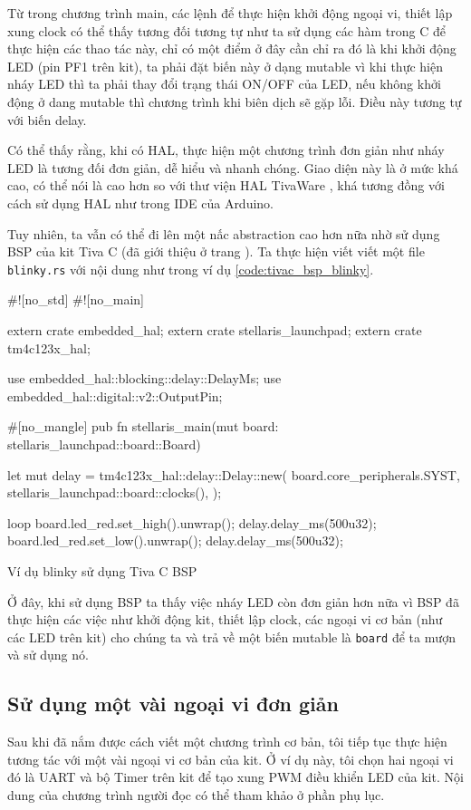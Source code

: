 Từ trong chương trình main, các lệnh để thực hiện khởi động ngoại vi, thiết lập xung clock có thể thấy tương đối tương tự như ta sử dụng các hàm trong C để thực hiện các thao tác này, chỉ có một điểm ở đây cần chỉ ra đó là khi khởi động LED (pin PF1 trên kit), ta phải đặt biến này ở dạng mutable vì khi thực hiện nháy LED thì ta phải thay đổi trạng thái ON/OFF của LED, nếu không khởi động ở dang mutable thì chương trình khi biên dịch sẽ gặp lỗi. Điều này tương tự với biến delay.

Có thể thấy rằng, khi có HAL, thực hiện một chương trình đơn giản như nháy LED là tương đối đơn giản, dễ hiểu và nhanh chóng.
Giao diện này là ở mức khá cao, có thể nói là cao hơn so với thư viện HAL TivaWare \cite{tivac_tivaware}, khá tương đồng với cách sử dụng HAL như trong IDE của Arduino.

Tuy nhiên, ta vẫn có thể đi lên một nấc abstraction cao hơn nữa nhờ sử dụng BSP của kit Tiva C (đã giới thiệu ở trang \pageref{lbl:tivac_bsp}).
Ta thực hiện viết viết một file \texttt{blinky.rs} với nội dung như trong ví dụ \ref{code:tivac_bsp_blinky}.

\begin{listing}[ht]
\begin{rustcode}
#![no_std]
#![no_main]

extern crate embedded_hal;
extern crate stellaris_launchpad;
extern crate tm4c123x_hal;

use embedded_hal::blocking::delay::DelayMs;
use embedded_hal::digital::v2::OutputPin;

#[no_mangle]
pub fn stellaris_main(mut board: stellaris_launchpad::board::Board) {
    let mut delay = tm4c123x_hal::delay::Delay::new(
        board.core_peripherals.SYST,
        stellaris_launchpad::board::clocks(),
    );

    loop {
        board.led_red.set_high().unwrap();
        delay.delay_ms(500u32);
        board.led_red.set_low().unwrap();
        delay.delay_ms(500u32);
    }
}
\end{rustcode}
\caption{Ví dụ blinky sử dụng Tiva C BSP}
\label{code:tivac_bsp_blinky}
\end{listing}

Ở đây, khi sử dụng BSP ta thấy việc nháy LED còn đơn giản hơn nữa vì BSP đã thực hiện các việc như khởi động kit, thiết lập clock, các ngoại vi cơ bản (như các LED trên kit) cho chúng ta và trả về một biến mutable là \texttt{board} để ta mượn và sử dụng nó.

\subsection{Sử dụng một vài ngoại vi đơn giản}
Sau khi đã nắm được cách viết một chương trình cơ bản, tôi tiếp tục thực hiện tương tác với một vài ngoại vi cơ bản của kit.
Ở ví dụ này, tôi chọn hai ngoại vi đó là UART và bộ Timer trên kit để tạo xung PWM điều khiển LED của kit.
Nội dung của chương trình người đọc có thể tham khảo ở phần phụ lục. %

